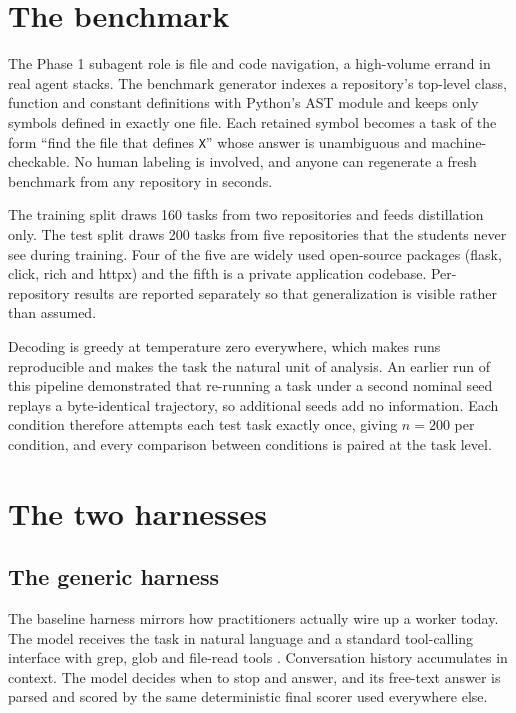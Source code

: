 \documentclass[11pt]{article}
\begin{document}
\section{The benchmark}

The Phase 1 subagent role is file and code navigation, a high-volume errand
in real agent stacks. The benchmark generator indexes a repository's
top-level class, function and constant definitions with Python's AST module
and keeps only symbols defined in exactly one file. Each retained symbol
becomes a task of the form ``find the file that defines \texttt{X}'' whose
answer is unambiguous and machine-checkable. No human labeling is involved,
and anyone can regenerate a fresh benchmark from any repository in seconds.

The training split draws 160 tasks from two repositories and feeds
distillation only. The test split draws 200 tasks from five repositories that
the students never see during training. Four of the five are widely used
open-source packages (flask, click, rich and httpx) and the fifth is a private
application codebase. Per-repository results are reported separately so that
generalization is visible rather than assumed.

Decoding is greedy at temperature zero everywhere, which makes runs
reproducible and makes the task the natural unit of analysis. An earlier run
of this pipeline demonstrated that re-running a task under a second nominal
seed replays a byte-identical trajectory, so additional seeds add no
information. Each condition therefore attempts each test task exactly once,
giving $n = 200$ per condition, and every comparison between conditions is
paired at the task level.

\section{The two harnesses}

\subsection{The generic harness}

The baseline harness mirrors how practitioners actually wire up a worker
today. The model receives the task in natural language and a standard
tool-calling interface with grep, glob and file-read tools
\citep{yao2023react}. Conversation history accumulates in context. The model
decides when to stop and answer, and its free-text answer is parsed and scored
by the same deterministic final scorer used everywhere else.
\end{document}
